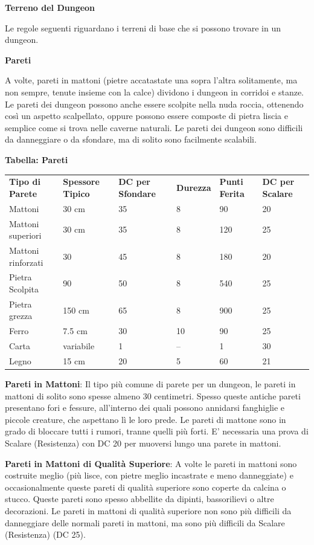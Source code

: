 \documentclass[a4paper,11pt,twoside,openany]{book}
\begin{document}
\textbf{Terreno del Dungeon}

Le regole seguenti riguardano i terreni di base che si possono trovare in un dungeon.

\textbf{Pareti}

A volte, pareti in mattoni (pietre accatastate una sopra l'altra solitamente, ma non sempre, tenute insieme con la calce) dividono i dungeon in corridoi e stanze. Le pareti dei dungeon possono anche essere scolpite nella nuda roccia, ottenendo così un aspetto scalpellato, oppure possono essere composte di pietra liscia e semplice come si trova nelle caverne naturali. Le pareti dei dungeon sono difficili da danneggiare o da sfondare, ma di solito sono facilmente scalabili.

\bigskip

\textbf{Tabella: Pareti}
\medskip

\begin{tabular}{llllll}
	\toprule
	\textbf{Tipo di Parete} & \textbf{Spessore Tipico} & \textbf{DC per Sfondare} & \textbf{Durezza} & \textbf{Punti Ferita} & \textbf{DC per Scalare}\\
	Mattoni  & 30 cm& 35   & 8 & 90& 20\\
	Mattoni superiori  & 30 cm& 35   & 8 & 120    & 25\\
	Mattoni rinforzati & 30   & 45   & 8 & 180    & 20\\
	Pietra Scolpita    & 90   & 50   & 8 & 540    & 25\\
	Pietra grezza & 150 cm    & 65   & 8 & 900    & 25\\
	Ferro    & 7.5 cm    & 30   & 10& 90& 25\\
	Carta    & variabile & 1    & --& 1 & 30\\
	Legno    & 15 cm& 20   & 5 & 60& 21\\
\end{tabular}

\bigskip

\textbf{Pareti in Mattoni}: Il tipo più comune di parete per un dungeon, le pareti in mattoni di solito sono spesse almeno 30 centimetri. Spesso queste antiche pareti presentano fori e fessure, all'interno dei quali possono annidarsi fanghiglie e piccole creature, che aspettano lì le loro prede. Le pareti di mattone sono in grado di bloccare tutti i rumori, tranne quelli più forti. E' necessaria una prova di Scalare (Resistenza) con DC 20 per muoversi lungo una parete in mattoni.

\textbf{Pareti in Mattoni di Qualità Superiore}: A volte le pareti in mattoni sono costruite meglio (più lisce, con pietre meglio incastrate e meno danneggiate) e occasionalmente queste pareti di qualità superiore sono coperte da calcina o stucco. Queste pareti sono spesso abbellite da dipinti, bassorilievi o altre decorazioni. Le pareti in mattoni di qualità superiore non sono più difficili da danneggiare delle normali pareti in mattoni, ma sono più difficili da Scalare (Resistenza) (DC 25).
\end{document}
